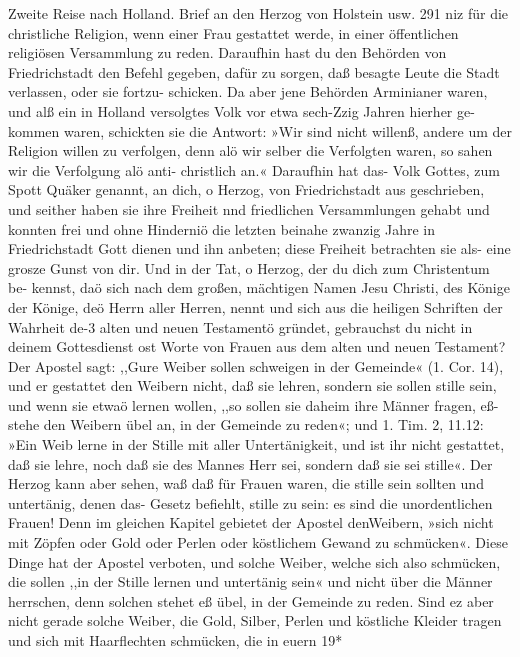 Zweite Reise nach Holland. Brief an den Herzog von Holstein usw. 291
niz für die christliche Religion, wenn einer Frau gestattet werde, in
einer öffentlichen religiösen Versammlung zu reden. Daraufhin hast
du den Behörden von Friedrichstadt den Befehl gegeben, dafür
zu sorgen, daß besagte Leute die Stadt verlassen, oder sie fortzu-
schicken. Da aber jene Behörden Arminianer waren, und alß ein
in Holland versolgtes Volk vor etwa sech-Zzig Jahren hierher ge-
kommen waren, schickten sie die Antwort: »Wir sind nicht willenß,
andere um der Religion willen zu verfolgen, denn alö wir selber
die Verfolgten waren, so sahen wir die Verfolgung alö anti-
christlich an.« Daraufhin hat das- Volk Gottes, zum Spott Quäker
genannt, an dich, o Herzog, von Friedrichstadt aus geschrieben,
und seither haben sie ihre Freiheit nnd friedlichen Versammlungen
gehabt und konnten frei und ohne Hinderniö die letzten beinahe
zwanzig Jahre in Friedrichstadt Gott dienen und ihn anbeten;
diese Freiheit betrachten sie als- eine grosze Gunst von dir.
Und in der Tat, o Herzog, der du dich zum Christentum be-
kennst, daö sich nach dem großen, mächtigen Namen Jesu Christi,
des Könige der Könige, deö Herrn aller Herren, nennt und sich
aus die heiligen Schriften der Wahrheit de-3 alten und neuen
Testamentö gründet, gebrauchst du nicht in deinem Gottesdienst
ost Worte von Frauen aus dem alten und neuen Testament? Der
Apostel sagt: ,,Gure Weiber sollen schweigen in der Gemeinde«
(1. Cor. 14), und er gestattet den Weibern nicht, daß sie lehren,
sondern sie sollen stille sein, und wenn sie etwaö lernen wollen,
,,so sollen sie daheim ihre Männer fragen, eß- stehe den Weibern
übel an, in der Gemeinde zu reden«; und 1. Tim. 2, 11.12: »Ein
Weib lerne in der Stille mit aller Untertänigkeit, und ist ihr nicht
gestattet, daß sie lehre, noch daß sie des Mannes Herr sei, sondern
daß sie sei stille«. Der Herzog kann aber sehen, waß daß für
Frauen waren, die stille sein sollten und untertänig, denen das-
Gesetz befiehlt, stille zu sein: es sind die unordentlichen Frauen!
Denn im gleichen Kapitel gebietet der Apostel denWeibern, »sich nicht
mit Zöpfen oder Gold oder Perlen oder köstlichem Gewand zu
schmücken«. Diese Dinge hat der Apostel verboten, und solche
Weiber, welche sich also schmücken, die sollen ,,in der Stille lernen
und untertänig sein« und nicht über die Männer herrschen, denn
solchen stehet eß übel, in der Gemeinde zu reden. Sind ez aber
nicht gerade solche Weiber, die Gold, Silber, Perlen und köstliche
Kleider tragen und sich mit Haarflechten schmücken, die in euern
19*



